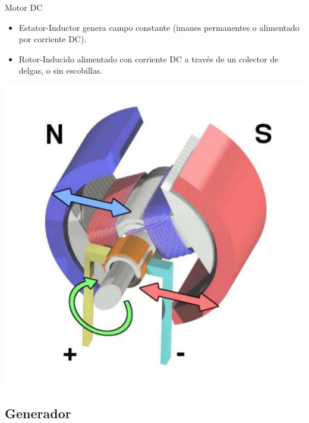 \documentclass[xcolor={usenames,svgnames,dvipsnames}]{beamer}
\begin{document}
\begin{frame}[label={sec:orgcb46dce}]{Motor DC}
\begin{itemize}
\item \alert{Estator-Inductor} genera \alert{campo constante} (imanes permanentes o alimentado por corriente DC).

\item \alert{Rotor-Inducido} alimentado con \alert{corriente DC} a través de un colector de delgas, o sin escobillas.
\end{itemize}

\begin{center}
\includegraphics[height=0.6\textheight]{../figs/Electric_motor_cycle_3.pdf}
\end{center}
\end{frame}


\subsection{Generador}
\label{sec:orge3efac1}
\end{document}
